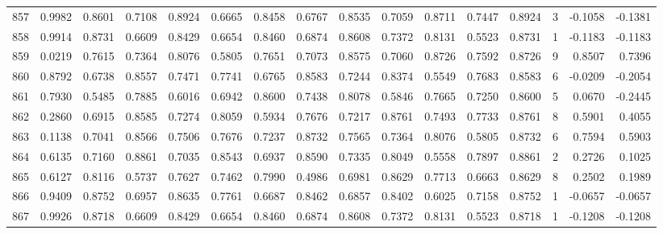 \begin{tabular}{lrrrrrrrrrrrrrrr}
857 &      0.9982 &  0.8601 &  0.7108 &  0.8924 &  0.6665 &  0.8458 &  0.6767 &  0.8535 &  0.7059 &  0.8711 &   0.7447 &     0.8924 &      3 &                   -0.1058 &                    -0.1381 \\
858 &      0.9914 &  0.8731 &  0.6609 &  0.8429 &  0.6654 &  0.8460 &  0.6874 &  0.8608 &  0.7372 &  0.8131 &   0.5523 &     0.8731 &      1 &                   -0.1183 &                    -0.1183 \\
859 &      0.0219 &  0.7615 &  0.7364 &  0.8076 &  0.5805 &  0.7651 &  0.7073 &  0.8575 &  0.7060 &  0.8726 &   0.7592 &     0.8726 &      9 &                    0.8507 &                     0.7396 \\
860 &      0.8792 &  0.6738 &  0.8557 &  0.7471 &  0.7741 &  0.6765 &  0.8583 &  0.7244 &  0.8374 &  0.5549 &   0.7683 &     0.8583 &      6 &                   -0.0209 &                    -0.2054 \\
861 &      0.7930 &  0.5485 &  0.7885 &  0.6016 &  0.6942 &  0.8600 &  0.7438 &  0.8078 &  0.5846 &  0.7665 &   0.7250 &     0.8600 &      5 &                    0.0670 &                    -0.2445 \\
862 &      0.2860 &  0.6915 &  0.8585 &  0.7274 &  0.8059 &  0.5934 &  0.7676 &  0.7217 &  0.8761 &  0.7493 &   0.7733 &     0.8761 &      8 &                    0.5901 &                     0.4055 \\
863 &      0.1138 &  0.7041 &  0.8566 &  0.7506 &  0.7676 &  0.7237 &  0.8732 &  0.7565 &  0.7364 &  0.8076 &   0.5805 &     0.8732 &      6 &                    0.7594 &                     0.5903 \\
864 &      0.6135 &  0.7160 &  0.8861 &  0.7035 &  0.8543 &  0.6937 &  0.8590 &  0.7335 &  0.8049 &  0.5558 &   0.7897 &     0.8861 &      2 &                    0.2726 &                     0.1025 \\
865 &      0.6127 &  0.8116 &  0.5737 &  0.7627 &  0.7462 &  0.7990 &  0.4986 &  0.6981 &  0.8629 &  0.7713 &   0.6663 &     0.8629 &      8 &                    0.2502 &                     0.1989 \\
866 &      0.9409 &  0.8752 &  0.6957 &  0.8635 &  0.7761 &  0.6687 &  0.8462 &  0.6857 &  0.8402 &  0.6025 &   0.7158 &     0.8752 &      1 &                   -0.0657 &                    -0.0657 \\
867 &      0.9926 &  0.8718 &  0.6609 &  0.8429 &  0.6654 &  0.8460 &  0.6874 &  0.8608 &  0.7372 &  0.8131 &   0.5523 &     0.8718 &      1 &                   -0.1208 &                    -0.1208 \\

\end{tabular}
